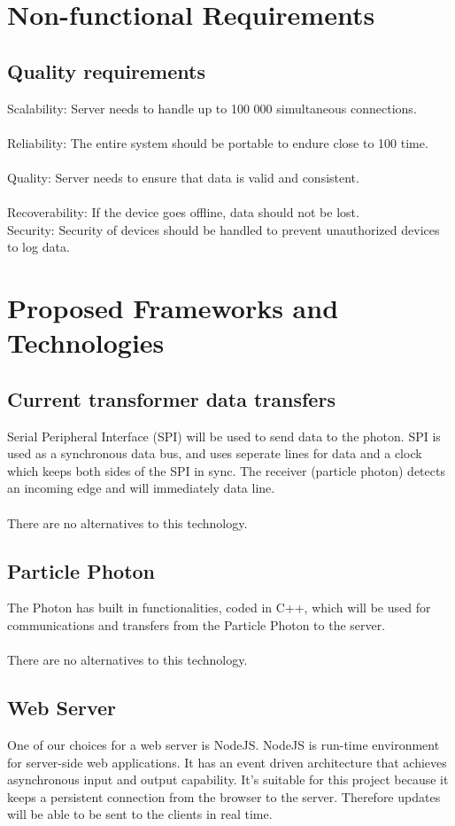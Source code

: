 \documentclass[paper=a4, fontsize=11pt]{scrartcl} %
\begin{document}
	\section{Non-functional Requirements}
	\subsection{Quality requirements}
	Scalability: Server needs to handle up to 100 000 simultaneous connections.\\
	\\Reliability: The entire system should be portable to endure close to 100%
	time.\\
	\\Quality: Server needs to ensure that data is valid and consistent.\\
	\\Recoverability: If the device goes offline, data should not be lost.\\
	Security: Security of devices should be handled to prevent unauthorized
	devices to log data.
	\newpage
	\section{Proposed Frameworks and Technologies}
	\subsection{Current transformer data transfers}
	Serial Peripheral Interface (SPI) will be used to send data to the photon. SPI is used as a synchronous data bus,
	and uses seperate lines for data and a clock which keeps both sides of the SPI in sync. The receiver (particle photon) detects an incoming 
	edge and will immediately data line.\\
	\\There are no alternatives to this technology.
	\subsection{Particle Photon}
	The Photon has built in functionalities, coded in C++, which will be used for communications and transfers from the Particle Photon to the server.\\ 
	\\There are no alternatives to this technology.
	\subsection{Web Server}
	One of our choices for a web server is NodeJS. NodeJS is run-time environment for server-side web applications. It has an event driven
	architecture that achieves asynchronous input and output capability. It's suitable for this project because it keeps a persistent connection
	from the browser to the server. Therefore updates will be able to be sent to the clients in real time.
\end{document}
